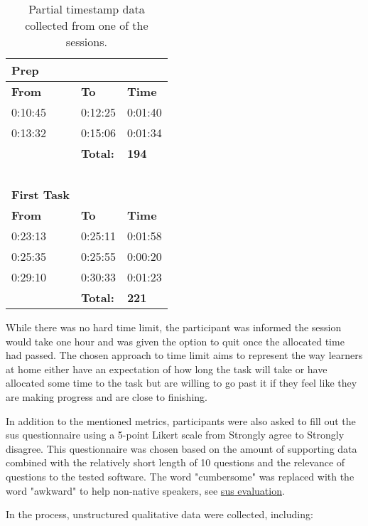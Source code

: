 \begin{table}[!ht]
    \centering
    \caption{Partial timestamp data collected from one of the sessions.}
    \label{table:timestamps}
    \begin{tabular}{|l l|l|}
        \hline
        \textbf{Prep} & & \\ \hline
        \textbf{From} & \textbf{To} & \textbf{Time} \\ \hline
        0:10:45 & 0:12:25 & 0:01:40 \\ \hline
        0:13:32 & 0:15:06 & 0:01:34 \\ \hline
        ~ & \textbf{Total:} & \textbf{194} \\ \hline
        ~ & ~ & ~ \\ \hline
        \textbf{First Task} & ~ & ~ \\ \hline
        \textbf{From} & \textbf{To} & \textbf{Time} \\ \hline
        0:23:13 & 0:25:11 & 0:01:58 \\ \hline
        0:25:35 & 0:25:55 & 0:00:20 \\ \hline
        0:29:10 & 0:30:33 & 0:01:23 \\ \hline
        ~ & \textbf{Total:} & \textbf{221} \\ \hline
    \end{tabular}
\end{table}

While there was no hard time limit, the participant was informed the session would take one hour and was given the option to quit once the allocated time had passed.
The chosen approach to time limit aims to represent the way learners at home either have an expectation of how long the task will take or have allocated some time to the task but are willing to go past it if they feel like they are making progress and are close to finishing.

In addition to the mentioned metrics, participants were also asked to fill out the \gls{sus} \parencite{brooke_sus_1996} questionnaire using a 5-point Likert scale from Strongly agree to Strongly disagree.
This questionnaire was chosen based on the amount of supporting data combined with the relatively short length of 10 questions and the relevance of questions to the tested software.
The word "cumbersome" was replaced with the word "awkward" to help non-native speakers, see \hyperref[sec:sus-evaluation]{\gls{sus} evaluation}.

In the process, unstructured qualitative data were collected, including:

